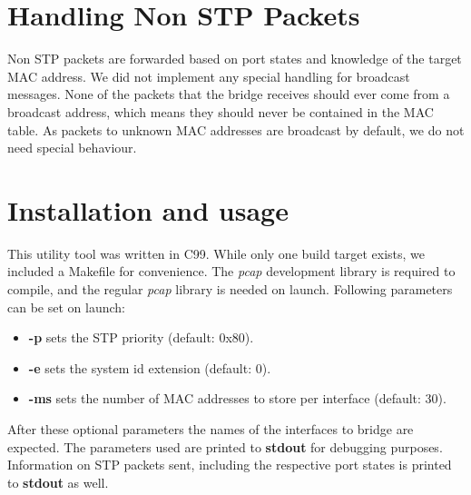 \section{Handling Non STP Packets}
Non STP packets are forwarded based on port states and knowledge of the target MAC address.
We did not implement any special handling for broadcast messages.
None of the packets that the bridge receives should ever come from a broadcast address, which means they should never be contained in the MAC table.
As packets to unknown MAC addresses are broadcast by default, we do not need special behaviour.


\section{Installation and usage}
This utility tool was written in C99.
While only one build target exists, we included a Makefile for convenience.
The \textit{pcap} development library is required to compile, and the regular \textit{pcap} library is needed on launch.
Following parameters can be set on launch:
\begin{itemize}
    \item \textbf{-p} sets the STP priority (default: 0x80).
    \item \textbf{-e} sets the system id extension (default: 0).
    \item \textbf{-ms} sets the number of MAC addresses to store per interface (default: 30).
\end{itemize}
After these optional parameters the names of the interfaces to bridge are expected.
The parameters used are printed to \textbf{stdout} for debugging purposes.
Information on STP packets sent, including the respective port states is printed to \textbf{stdout} as well.
